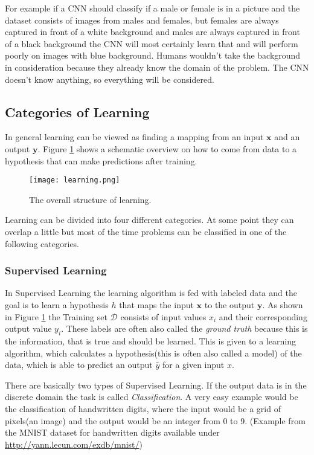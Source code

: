 For example if a CNN should classify if a male or female is in a picture and the dataset consists of images from males and females, but females are always captured in front of a white background and males are always captured in front of a black background the CNN will most certainly learn that and will perform poorly on images with blue background.
Humans wouldn't take the background in consideration because they already know the domain of the problem.
The CNN doesn't know anything, so everything will be considered.

\subsection{Categories of Learning}
In general learning can be viewed as finding a mapping from an input $\mathbf{x}$ and an output $\mathbf{y}$.
Figure \ref{fig:learning} shows a schematic overview on how to come from data to a hypothesis that can make predictions after training.

\begin{figure}
\centering
  \texttt{[image: learning.png]}
  \caption{The overall structure of learning.\cite{LVDFKI}}
  \label{fig:learning}
\end{figure}

Learning can be divided into four different categories.
At some point they can overlap a little but most of the time problems can be classified in one of the following categories.

\subsubsection{Supervised Learning}
In Supervised Learning the learning algorithm is fed with labeled data and the goal is to learn a hypothesis $h$ that maps the input $\mathbf{x}$ to the output $\mathbf{y}$.
As shown in Figure \ref{fig:learning} the Training set $\mathcal{D}$ consists of input values $x_i$ and their corresponding output value $y_i$. These labels are often also called the \emph{ground truth} because this is the information, that is true and should be learned.
This is given to a learning algorithm, which calculates a hypothesis(this is often also called a model) of the data, which is able to predict an output $\hat{y}$ for a given input $x$.

There are basically two types of Supervised Learning.
If the output data is in the discrete domain the task is called \emph{Classification}.
A very easy example would be the classification of handwritten digits, where the input would be a grid of pixels(an image) and the output would be an integer from 0 to 9. 
(Example from the MNIST dataset for handwritten digits\cite{YannGrad1998} available under \url{http://yann.lecun.com/exdb/mnist/}) 

